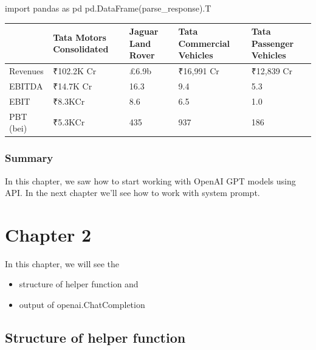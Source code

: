 \documentclass[
  letterpaper,
  DIV=11,
  numbers=noendperiod]{scrreprt}
\newenvironment{Shaded}{\begin{snugshade}}{\end{snugshade}}
\newcommand{\ImportTok}[1]{\textcolor[rgb]{0.00,0.46,0.62}{#1}}
\newcommand{\NormalTok}[1]{\textcolor[rgb]{0.00,0.23,0.31}{#1}}
\begin{document}
\begin{Shaded}
\begin{Highlighting}[]
\ImportTok{import}\NormalTok{ pandas }\ImportTok{as}\NormalTok{ pd}
\NormalTok{pd.DataFrame(parse\_response).T}
\end{Highlighting}
\end{Shaded}

\begin{longtable}[]{@{}lllll@{}}
\toprule\noalign{}
& Tata Motors Consolidated & Jaguar Land Rover & Tata Commercial
Vehicles & Tata Passenger Vehicles \\
\midrule\noalign{}
\endhead
\bottomrule\noalign{}
\endlastfoot
Revenues & ₹102.2K Cr & £6.9b & ₹16,991 Cr & ₹12,839 Cr \\
EBITDA & ₹14.7K Cr & 16.3 & 9.4 & 5.3 \\
EBIT & ₹8.3KCr & 8.6 & 6.5 & 1.0 \\
PBT (bei) & ₹5.3KCr & 435 & 937 & 186 \\
\end{longtable}

\hypertarget{summary}{%
\subsection{Summary}\label{summary}}

In this chapter, we saw how to start working with OpenAI GPT models
using API. In the next chapter we'll see how to work with system prompt.


\hypertarget{chapter-2}{%
\chapter{Chapter 2}\label{chapter-2}}

In this chapter, we will see the

\begin{itemize}
\item
  structure of helper function and
\item
  output of openai.ChatCompletion
\end{itemize}

\hypertarget{structure-of-helper-function}{%
\section{Structure of helper
function}\label{structure-of-helper-function}}
\end{document}
